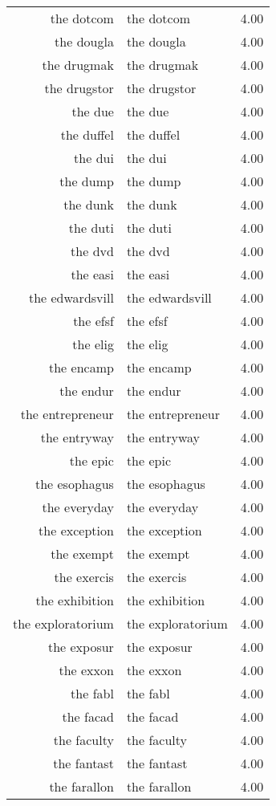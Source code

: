 \begin{table}[ht]
\begin{tabular}{rlr}
  the dotcom & the dotcom & 4.00 \\ 
  the dougla & the dougla & 4.00 \\ 
  the drugmak & the drugmak & 4.00 \\ 
  the drugstor & the drugstor & 4.00 \\ 
  the due & the due & 4.00 \\ 
  the duffel & the duffel & 4.00 \\ 
  the dui & the dui & 4.00 \\ 
  the dump & the dump & 4.00 \\ 
  the dunk & the dunk & 4.00 \\ 
  the duti & the duti & 4.00 \\ 
  the dvd & the dvd & 4.00 \\ 
  the easi & the easi & 4.00 \\ 
  the edwardsvill & the edwardsvill & 4.00 \\ 
  the efsf & the efsf & 4.00 \\ 
  the elig & the elig & 4.00 \\ 
  the encamp & the encamp & 4.00 \\ 
  the endur & the endur & 4.00 \\ 
  the entrepreneur & the entrepreneur & 4.00 \\ 
  the entryway & the entryway & 4.00 \\ 
  the epic & the epic & 4.00 \\ 
  the esophagus & the esophagus & 4.00 \\ 
  the everyday & the everyday & 4.00 \\ 
  the exception & the exception & 4.00 \\ 
  the exempt & the exempt & 4.00 \\ 
  the exercis & the exercis & 4.00 \\ 
  the exhibition & the exhibition & 4.00 \\ 
  the exploratorium & the exploratorium & 4.00 \\ 
  the exposur & the exposur & 4.00 \\ 
  the exxon & the exxon & 4.00 \\ 
  the fabl & the fabl & 4.00 \\ 
  the facad & the facad & 4.00 \\ 
  the faculty & the faculty & 4.00 \\ 
  the fantast & the fantast & 4.00 \\ 
  the farallon & the farallon & 4.00 \\ 

\end{tabular}
\end{table}
